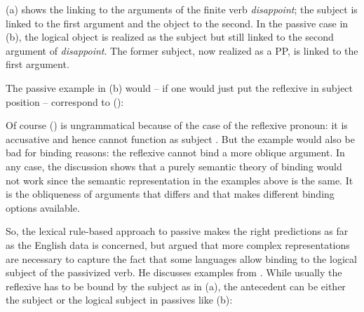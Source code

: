 \documentclass[output=paper,biblatex,babelshorthands,newtxmath,draftmode,colorlinks,citecolor=brown]{langscibook}
\begin{document}
{\jamwidth=5cm
\eal
{}
\zl
(a) shows the linking to the arguments of the finite verb \emph{disappoint}; the subject is
linked to the first argument and the object to the second. In the passive case in (b), the
logical object is realized as the subject but still linked to the second argument of
\emph{disappoint}. The former subject, now realized as a PP, is linked to the first argument. 

The passive example in (b) would -- if one would just put the reflexive in subject position
-- correspond to ():
\z
}

\noindent
Of course () is ungrammatical because of the case of the reflexive pronoun: it is accusative
and hence cannot function as subject \citep[]{Brame77}. But the example would also be bad for binding reasons: the
reflexive cannot bind a more oblique argument. In any case, the discussion shows that a purely
semantic theory of binding would not work since the semantic representation in the examples above is
the same. It is the obliqueness of arguments that differs and that makes different binding options available.

So, the lexical rule-based approach to passive makes the right predictions as far as the English
data is concerned, but \citet{Perlmutter1984} argued that more complex representations are necessary to capture the
fact that some languages allow binding to the logical subject of the passivized verb. He discusses
examples from . While usually the reflexive has to be bound by the subject as in
(a), the antecedent can be either the subject or the logical subject in passives like (b):
\end{document}
